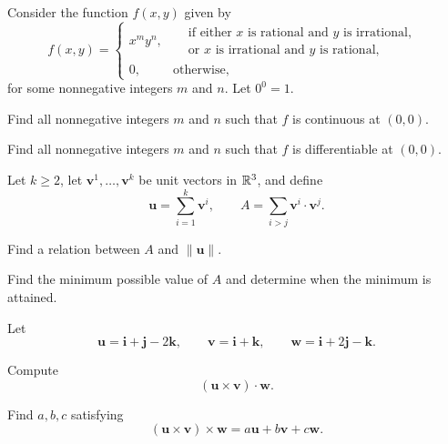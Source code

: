 \begin{problem}
Consider the function $f(x, y)$ given by
\[
f(x, y)=
\begin{cases}
x^m y^n, & \begin{aligned}&\text{if either $x$ is rational and $y$ is irrational, }\\[-0.15em]&\text{or $x$ is irrational and $y$ is rational, }\end{aligned}\\[0.8em]
0, & \text{otherwise},
\end{cases}
\]
for some nonnegative integers $m$ and $n$. Let $0^0=1$.
\begin{problemsubparts}
\item Find all nonnegative integers $m$ and $n$ such that $f$ is continuous at $(0, 0)$.
\item Find all nonnegative integers $m$ and $n$ such that $f$ is differentiable at $(0, 0)$.
\end{problemsubparts}
\end{problem}

\begin{problem}
Let $k\ge2$, let $\mathbf v^1, \ldots, \mathbf v^k$ be unit vectors in $\mathbb{R}^3$, and define
\[
\mathbf u=\sum_{i=1}^{k}\mathbf v^i,
\qquad
A=\sum_{i>j}\mathbf v^i\cdot\mathbf v^j.
\]
\begin{problemsubparts}
\item Find a relation between $A$ and $\|\mathbf u\|$.
\item Find the minimum possible value of $A$ and determine when the minimum is attained.
\end{problemsubparts}
\end{problem}

\begin{problem}
Let
\[
\mathbf u=\mathbf i+\mathbf j-2\mathbf k,
\qquad
\mathbf v=\mathbf i+\mathbf k,
\qquad
\mathbf w=\mathbf i+2\mathbf j-\mathbf k.
\]
\begin{problemsubparts}
\item Compute
\[
(\mathbf u\times\mathbf v)\cdot\mathbf w.
\]
\item Find $a, b, c$ satisfying
\[
(\mathbf u\times\mathbf v)\times\mathbf w
=a\mathbf u+b\mathbf v+c\mathbf w.
\]
\end{problemsubparts}
\end{problem}

